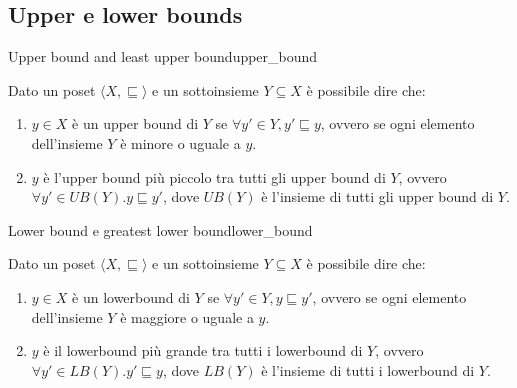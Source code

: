 \subsection{Upper e lower bounds}

\begin{definizione}{Upper bound and least upper bound}{upper_bound}

Dato un poset $\langle X, \sqsubseteq \rangle$ e un sottoinsieme $Y \subseteq X$
è possibile dire che:
\begin{enumerate}
    \item $y \in X$ è un upper bound di $Y$ se $\forall y' \in Y, y' \sqsubseteq y$,
    ovvero se ogni elemento dell'insieme $Y$ è minore o uguale a $y$.
    \item $y$ è l'upper bound più piccolo tra tutti gli upper bound di $Y$, ovvero
    $\forall y' \in UB(Y). y \sqsubseteq y'$, dove $UB(Y)$ è l'insieme di
    tutti gli upper bound di $Y$.
\end{enumerate}

\end{definizione}

\begin{definizione}{Lower bound e greatest lower bound}{lower_bound}

Dato un poset $\langle X, \sqsubseteq \rangle$ e un sottoinsieme $Y \subseteq X$
è possibile dire che:
\begin{enumerate}
    \item $y \in X$ è un lowerbound di $Y$ se $\forall y' \in Y, y \sqsubseteq y'$,
    ovvero se ogni elemento dell'insieme $Y$ è maggiore o uguale a $y$.
    \item $y$ è il lowerbound più grande tra tutti i lowerbound di $Y$, ovvero
    $\forall y' \in LB(Y). y' \sqsubseteq y$, dove $LB(Y)$ è l'insieme di
    tutti i lowerbound di $Y$.
\end{enumerate}

\end{definizione}


